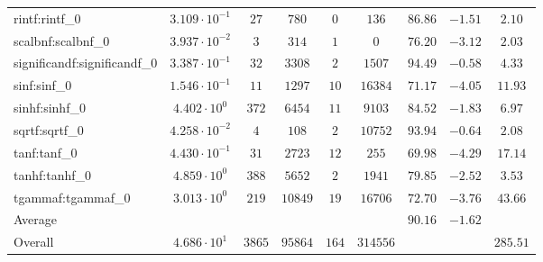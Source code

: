 \begin{tabular}{|l|c|c|c|c|c|c|c|c|}
rintf:rintf\_0               & $ 3.109 \cdot 10^{-1} $ & $ 27     $ & $ 780   $ & $ 0   $ & $ 136    $ & $ 86.86       $ & $ -1.51   $ & $ 2.10    $ \\
scalbnf:scalbnf\_0           & $ 3.937 \cdot 10^{-2} $ & $ 3      $ & $ 314   $ & $ 1   $ & $ 0      $ & $ 76.20       $ & $ -3.12   $ & $ 2.03    $ \\
significandf:significandf\_0 & $ 3.387 \cdot 10^{-1} $ & $ 32     $ & $ 3308  $ & $ 2   $ & $ 1507   $ & $ 94.49       $ & $ -0.58   $ & $ 4.33    $ \\
sinf:sinf\_0                 & $ 1.546 \cdot 10^{-1} $ & $ 11     $ & $ 1297  $ & $ 10  $ & $ 16384  $ & $ 71.17       $ & $ -4.05   $ & $ 11.93   $ \\
sinhf:sinhf\_0               & $ 4.402 \cdot 10^{0}  $ & $ 372    $ & $ 6454  $ & $ 11  $ & $ 9103   $ & $ 84.52       $ & $ -1.83   $ & $ 6.97    $ \\
sqrtf:sqrtf\_0               & $ 4.258 \cdot 10^{-2} $ & $ 4      $ & $ 108   $ & $ 2   $ & $ 10752  $ & $ 93.94       $ & $ -0.64   $ & $ 2.08    $ \\
tanf:tanf\_0                 & $ 4.430 \cdot 10^{-1} $ & $ 31     $ & $ 2723  $ & $ 12  $ & $ 255    $ & $ 69.98       $ & $ -4.29   $ & $ 17.14   $ \\
tanhf:tanhf\_0               & $ 4.859 \cdot 10^{0}  $ & $ 388    $ & $ 5652  $ & $ 2   $ & $ 1941   $ & $ 79.85       $ & $ -2.52   $ & $ 3.53    $ \\
tgammaf:tgammaf\_0           & $ 3.013 \cdot 10^{0}  $ & $ 219    $ & $ 10849 $ & $ 19  $ & $ 16706  $ & $ 72.70       $ & $ -3.76   $ & $ 43.66   $ \\
\hline
Average                      & $                     $ & $        $ & $       $ & $     $ & $        $ & $ 90.16       $ & $ -1.62   $ & $         $ \\
\hline
Overall                      & $ 4.686 \cdot 10^{1}  $ & $ 3865   $ & $ 95864 $ & $ 164 $ & $ 314556 $ & $             $ & $         $ & $ 285.51  $ \\
\hline
\end{tabular}
